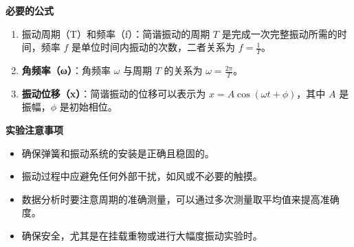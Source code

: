 \documentclass[dvipsnames, svgnames,a4paper,11pt]{article}
\begin{document}
	\textbf{必要的公式}
	
	\begin{enumerate}
		\item 振动周期（T）和频率（f）：简谐振动的周期 \( T \) 是完成一次完整振动所需的时间，频率 \( f \) 是单位时间内振动的次数，二者关系为 \( f = \frac{1}{T} \)。
		
		\item \textbf{角频率（ω）}：角频率 \( \omega \) 与周期 \( T \) 的关系为 \( \omega = \frac{2\pi}{T} \)。
		
		\item \textbf{振动位移（x）}：简谐振动的位移可以表示为 \( x = A \cos(\omega t + \phi) \)，其中 \( A \) 是振幅，\( \phi \) 是初始相位。
		
	\end{enumerate}
	
	\textbf{实验注意事项}
	
	\begin{itemize}
		\item 确保弹簧和振动系统的安装是正确且稳固的。
		\item 振动过程中应避免任何外部干扰，如风或不必要的触摸。
		\item 数据分析时要注意周期的准确测量，可以通过多次测量取平均值来提高准确度。
		\item 确保安全，尤其是在挂载重物或进行大幅度振动实验时。
	\end{itemize}
	
\end{document}
